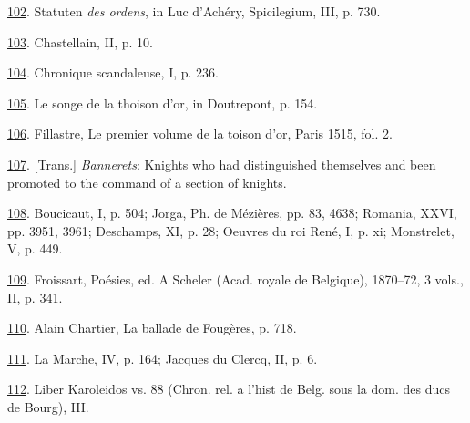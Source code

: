 \protect\hypertarget{23_NOTES.xhtmlux5cux23id_1732}{\protect\hyperlink{10_Chapter_Three__THE_HEROIC_DREAM.xhtmlux5cux23id_1731}{102}}.
Statuten \emph{des ordens}, in Luc d'Achéry, Spicilegium, III, p. 730.

\protect\hypertarget{23_NOTES.xhtmlux5cux23id_1730}{\protect\hyperlink{10_Chapter_Three__THE_HEROIC_DREAM.xhtmlux5cux23id_1729}{103}}.
Chastellain, II, p. 10.

\protect\hypertarget{23_NOTES.xhtmlux5cux23id_1728}{\protect\hyperlink{10_Chapter_Three__THE_HEROIC_DREAM.xhtmlux5cux23id_1727}{104}}.
Chronique scandaleuse, I, p. 236.

\protect\hypertarget{23_NOTES.xhtmlux5cux23id_1726}{\protect\hyperlink{10_Chapter_Three__THE_HEROIC_DREAM.xhtmlux5cux23id_1725}{105}}.
Le songe de la thoison d'or, in Doutrepont, p. 154.

\protect\hypertarget{23_NOTES.xhtmlux5cux23id_1724}{\protect\hyperlink{10_Chapter_Three__THE_HEROIC_DREAM.xhtmlux5cux23id_1723}{106}}.
Fillastre, Le premier volume de la toison d'or, Paris 1515, fol. 2.

\protect\hypertarget{23_NOTES.xhtmlux5cux23id_1722}{\protect\hyperlink{10_Chapter_Three__THE_HEROIC_DREAM.xhtmlux5cux23id_1721}{107}}.
{[}Trans.{]} \emph{Bannerets}: Knights who had distinguished themselves
and been promoted to the command of a section of knights.

\protect\hypertarget{23_NOTES.xhtmlux5cux23id_1720}{\protect\hyperlink{10_Chapter_Three__THE_HEROIC_DREAM.xhtmlux5cux23id_1719}{108}}.
Boucicaut, I, p. 504; Jorga, Ph. de Mézières, pp. 83, 4638; Romania,
XXVI, pp. 3951, 3961; Deschamps, XI, p. 28; Oeuvres du roi René, I, p.
xi; Monstrelet, V, p. 449.

\protect\hypertarget{23_NOTES.xhtmlux5cux23id_1718}{\protect\hyperlink{10_Chapter_Three__THE_HEROIC_DREAM.xhtmlux5cux23id_1717}{109}}.
Froissart, Poésies, ed. A Scheler (Acad. royale de Belgique), 1870--72,
3 vols., II, p. 341.

\protect\hypertarget{23_NOTES.xhtmlux5cux23id_1716}{\protect\hyperlink{10_Chapter_Three__THE_HEROIC_DREAM.xhtmlux5cux23id_1715}{110}}.
Alain Chartier, La ballade de Fougères, p. 718.

\protect\hypertarget{23_NOTES.xhtmlux5cux23id_1714}{\protect\hyperlink{10_Chapter_Three__THE_HEROIC_DREAM.xhtmlux5cux23id_1713}{111}}.
La Marche, IV, p. 164; Jacques du Clercq, II, p. 6.

\protect\hypertarget{23_NOTES.xhtmlux5cux23id_1712}{\protect\hyperlink{10_Chapter_Three__THE_HEROIC_DREAM.xhtmlux5cux23id_1711}{112}}.
Liber Karoleidos vs. 88 (Chron. rel. a l'hist de Belg. sous la dom. des
ducs de Bourg), III.

